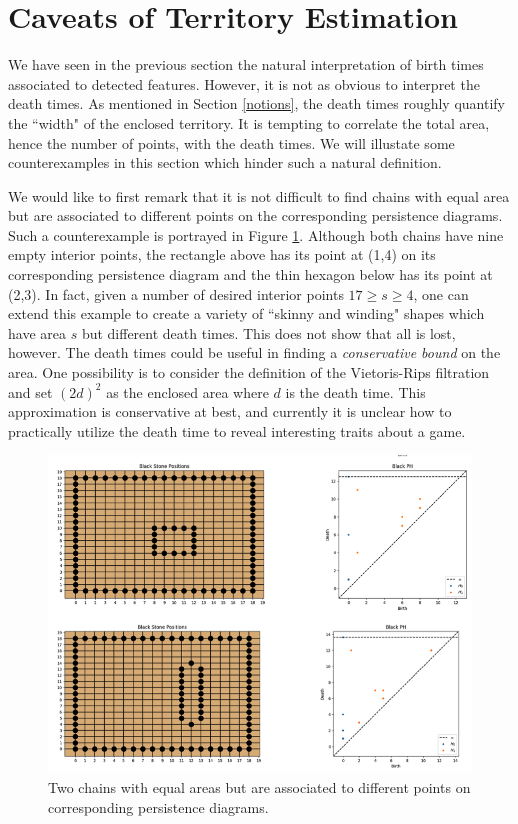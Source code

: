 \documentclass[11pt]{article}
\begin{document}
\section{Caveats of Territory Estimation}
We have seen in the previous section the natural interpretation of birth times associated to detected features. However, it is not as obvious to interpret the death times. As mentioned in Section \ref{notions}, the death times roughly quantify the ``width" of the enclosed territory. It is tempting to correlate the total area, hence the number of points, with the death times. We will illustate some counterexamples in this section which hinder such a natural definition.

We would like to first remark that it is not difficult to find chains with equal area but are associated to different points on the corresponding persistence diagrams. Such a counterexample is portrayed in Figure \ref{fig:counter1}. Although both chains have nine empty interior points, the rectangle above has its point at (1,4) on its corresponding persistence diagram and the thin hexagon below has its point at (2,3). In fact, given a number of desired interior points $17 \geq s \geq 4$, one can extend this example to create a variety of ``skinny and winding" shapes which have area $s$ but different death times. This does not show that all is lost, however. The death times could be useful in finding a \textit{conservative bound} on the area. One possibility is to consider the definition of the Vietoris-Rips filtration and set $(2d)^2$ as the enclosed area where $d$ is the death time. This approximation is conservative at best, and currently it is unclear how to practically utilize the death time to reveal interesting traits about a game.
\begin{figure}[ht]
  \centering
  \includegraphics[scale=0.8]{counter1.png}
  \caption{Two chains with equal areas but are associated to different points on corresponding persistence diagrams.}
  \label{fig:counter1}
\end{figure}
\end{document}
